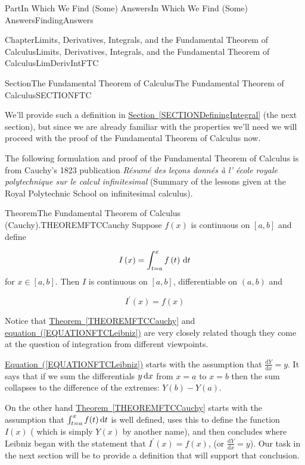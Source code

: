 \documentclass[oneside,10pt,]{book}
\newcommand{\xreffont}{\relax}
\numberwithin{equation}{part}
\newcommand{\dx}[1]{\,{\rm d}#1}
\newcommand{\dfdx}[2]{\frac{\text{d}{#1}}{\text{d}{#2}}}
\begin{document}
\begin{partptx}{Part}{In Which We Find (Some) Answers}{}{In Which We Find (Some) Answers}{}{}{FindingAnswers}
\begin{chapterptx}{Chapter}{Limits, Derivatives, Integrals, and the Fundamental Theorem of Calculus}{}{Limits, Derivatives, Integrals, and the Fundamental Theorem of Calculus}{}{}{LimDerivIntFTC}
\begin{sectionptx}{Section}{The Fundamental Theorem of Calculus}{}{The Fundamental Theorem of Calculus}{}{}{SECTIONFTC}
\par
We'll provide such a definition in \hyperref[SECTIONDefiningIntegral]{Section~{\xreffont\ref{SECTIONDefiningIntegral}}} (the next section), but since we are already familiar with the properties we'll need we will proceed with the proof of the Fundamental Theorem of Calculus now.%
\par
The following formulation and proof of the Fundamental Theorem of Calculus is from Cauchy's 1823 publication \textit{Résumé des leçons donnés à l' école royale polytechnique sur le calcul infinitesimal} (Summary of the lessons given at the Royal Polytechnic School on infinitesimal calculus).%
\begin{theorem}{Theorem}{The Fundamental Theorem of Calculus (Cauchy).}{}{THEOREMFTCCauchy}%
%
Suppose \(f\left(x\right)\) is continuous on \([a,b]\) and define%
\par
%
\begin{equation*}
I\left(x\right)=\int^x_{t=a}{f\left(t\right)\dx{t}}
\end{equation*}
for \(x\in [a,b]\).  Then \(I\) is continuous on \([a,b]\), differentiable on \((a,b)\) and%
\par
%
\begin{equation*}
I^\prime\left(x\right)=f(x)
\end{equation*}
%
\end{theorem}
Notice that \hyperref[THEOREMFTCCauchy]{Theorem~{\xreffont\ref{THEOREMFTCCauchy}}} and \hyperref[EQUATIONFTCLeibniz]{equation~({\xreffont\ref{EQUATIONFTCLeibniz}})} are very closely related though they come at the question of integration from different viewpoints.%
\par
\hyperref[EQUATIONFTCLeibniz]{Equation~({\xreffont\ref{EQUATIONFTCLeibniz}})} starts with the assumption that \(\dfdx{Y}{x}=y \). It says that if we sum the differentials \(y\dx{x}\) from  \(x=a\) to \(x=b\) then the sum collapses to the difference of the extremes: \(Y(b)-Y(a)\).%
\par
On the other hand \hyperref[THEOREMFTCCauchy]{Theorem~{\xreffont\ref{THEOREMFTCCauchy}}} starts with the assumption that \(\int_{t=a}^x f(t)\dx{t}\) is well defined, uses this to define the function \(I(x)\) ( which is simply \(Y(x)\) by another name), and then concludes where Leibniz began \textemdash{} with the statement that \(I^\prime
(x)=f(x)\), (or \(\dfdx{Y}{x}=y\)). Our task in the next section will be to provide a definition that will support that conclusion.%
\par

\end{sectionptx}
\end{chapterptx}
\end{partptx}
\end{document}
